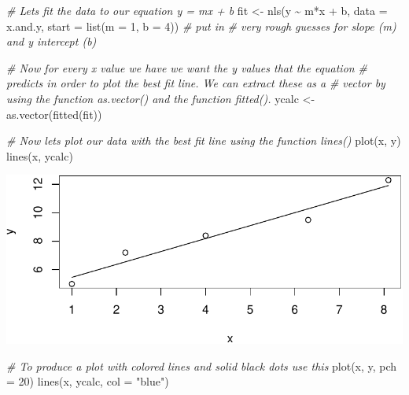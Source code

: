 \documentclass[
]{article}
\newenvironment{Shaded}{\begin{snugshade}}{\end{snugshade}}
\newcommand{\AttributeTok}[1]{\textcolor[rgb]{0.77,0.63,0.00}{#1}}
\newcommand{\CommentTok}[1]{\textcolor[rgb]{0.56,0.35,0.01}{\textit{#1}}}
\newcommand{\DecValTok}[1]{\textcolor[rgb]{0.00,0.00,0.81}{#1}}
\newcommand{\FunctionTok}[1]{\textcolor[rgb]{0.00,0.00,0.00}{#1}}
\newcommand{\NormalTok}[1]{#1}
\newcommand{\OtherTok}[1]{\textcolor[rgb]{0.56,0.35,0.01}{#1}}
\newcommand{\SpecialCharTok}[1]{\textcolor[rgb]{0.00,0.00,0.00}{#1}}
\newcommand{\StringTok}[1]{\textcolor[rgb]{0.31,0.60,0.02}{#1}}
\begin{document}
\begin{Shaded}
\begin{Highlighting}[]
\CommentTok{\# Let\textquotesingle{}s fit the data to our equation y = mx + b}
\NormalTok{fit }\OtherTok{\textless{}{-}} \FunctionTok{nls}\NormalTok{(y }\SpecialCharTok{\textasciitilde{}}\NormalTok{ m}\SpecialCharTok{*}\NormalTok{x }\SpecialCharTok{+}\NormalTok{ b, }\AttributeTok{data =}\NormalTok{ x.and.y, }\AttributeTok{start =} \FunctionTok{list}\NormalTok{(}\AttributeTok{m =} \DecValTok{1}\NormalTok{, }\AttributeTok{b =} \DecValTok{4}\NormalTok{)) }\CommentTok{\# put in }
\CommentTok{\# very rough guesses for slope (m) and y intercept (b)}

\CommentTok{\# Now for every x value we have we want the y values that the equation }
\CommentTok{\# predicts in order to plot the best fit line. We can extract these as a }
\CommentTok{\# vector by using the function as.vector() and the function fitted().}
\NormalTok{ycalc }\OtherTok{\textless{}{-}} \FunctionTok{as.vector}\NormalTok{(}\FunctionTok{fitted}\NormalTok{(fit))}

\CommentTok{\# Now let\textquotesingle{}s plot our data with the best fit line using the function lines()}
\FunctionTok{plot}\NormalTok{(x, y)}
\FunctionTok{lines}\NormalTok{(x, ycalc)}
\end{Highlighting}
\end{Shaded}

\includegraphics{skeleton_files/figure-latex/unnamed-chunk-5-3.pdf}

\begin{Shaded}
\begin{Highlighting}[]
\CommentTok{\# To produce a plot with colored lines and solid black dots use this}
\FunctionTok{plot}\NormalTok{(x, y,}
     \AttributeTok{pch =} \DecValTok{20}\NormalTok{)}
\FunctionTok{lines}\NormalTok{(x, ycalc, }\AttributeTok{col =} \StringTok{"blue"}\NormalTok{)}
\end{Highlighting}
\end{Shaded}
\end{document}
